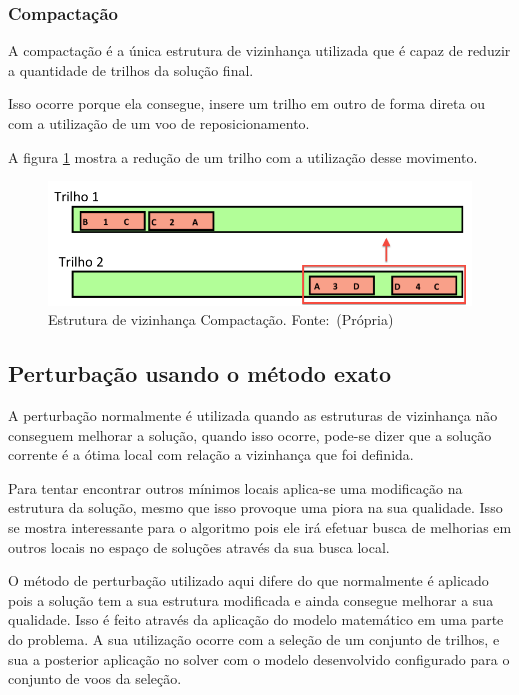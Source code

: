  \subsubsection{Compactação}
 
A compactação é a única estrutura de vizinhança utilizada que é capaz de
reduzir a quantidade de trilhos da solução final.
 
Isso ocorre porque ela consegue, insere um trilho em outro de forma direta ou
com a utilização de um voo de reposicionamento.
 
A figura \ref{fig:compactacao} mostra a redução de um trilho com a utilização
desse movimento.

\begin{figure}[ht] 
	\caption{Estrutura de vizinhança Compactação. \newline \mbox{Fonte:
	(Própria)}}\label{fig:compactacao}
	\includegraphics[scale=0.4]{./img/compactacao}
	
\end{figure}
 
 \subsection{Perturbação usando o método exato}
   
A perturbação normalmente é utilizada quando as estruturas de vizinhança não
conseguem melhorar a solução, quando isso ocorre, pode-se dizer que a
solução corrente é a ótima local com relação a vizinhança que foi definida.
 
Para tentar encontrar outros mínimos locais aplica-se uma modificação na
estrutura da solução, mesmo que isso provoque uma piora na sua qualidade. Isso
se mostra interessante para o algoritmo pois ele irá efetuar busca de melhorias
em outros locais no espaço de soluções através da sua busca local.
 
O método de perturbação utilizado aqui difere do que normalmente é aplicado
pois a solução tem a sua estrutura modificada e ainda consegue melhorar a sua
qualidade. Isso é feito através da aplicação do modelo matemático em uma
parte do problema. A sua utilização ocorre com a seleção de um conjunto de
trilhos, e sua a posterior aplicação no solver com o modelo desenvolvido
configurado para o conjunto de voos da seleção.

